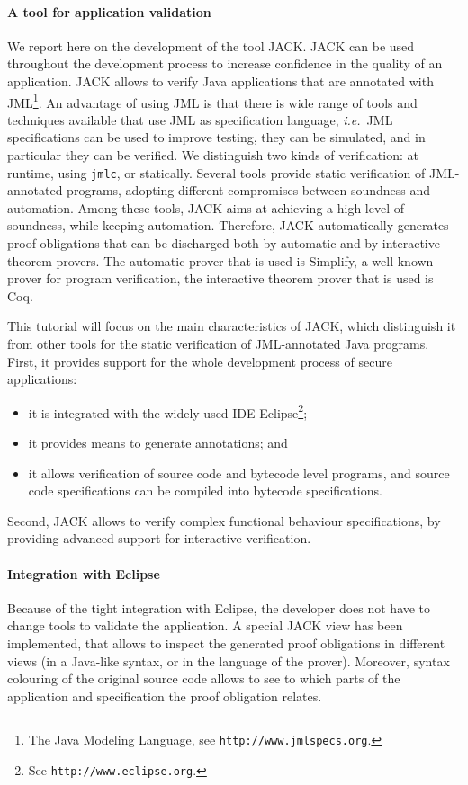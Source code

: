\documentclass[]{llncs}
\begin{document}
\paragraph{A tool for application validation}
We report here on the development of the tool JACK. JACK can be used
throughout the development process to increase confidence in the
quality of an application. JACK allows to verify Java applications
that are annotated with JML\footnote{The Java Modeling Language, see
\texttt{http://www.jmlspecs.org}.}. An advantage of using JML is that
there is wide range of tools and techniques available that use JML as
specification language, \emph{i.e.}\ JML specifications can be used to
improve testing, they can be simulated, and in particular they can be
verified. We distinguish two kinds of verification: at runtime, using
\texttt{jmlc}, or statically. Several tools provide
static verification of JML-annotated programs, adopting different
compromises between soundness and automation.  Among these tools, JACK
aims at achieving a high level of soundness, while keeping
automation. Therefore, JACK automatically generates proof obligations
that can be discharged both by automatic and by interactive theorem
provers. The automatic prover that is used is Simplify, a well-known
prover for program verification, the interactive theorem prover that
is used is Coq.

This tutorial will focus on the main characteristics of JACK, which
distinguish it from other tools for the static verification of
JML-annotated Java programs. First, it provides support for the whole
development process of secure applications:
\begin{itemize}
\item it is integrated with the widely-used IDE Eclipse\footnote{See
\texttt{http://www.eclipse.org}.};
\item it provides means to generate annotations; and
\item it allows verification of source code and bytecode level
programs, and source code specifications can be compiled into bytecode
specifications.
\end{itemize}
Second, JACK allows to verify complex functional behaviour
specifications, by providing advanced support for interactive
verification. 


\paragraph{Integration with Eclipse}
Because of the tight integration with Eclipse, the developer does not
have to change tools to validate the application. A special JACK view
has been implemented, that allows to inspect the generated proof
obligations in different views (in a Java-like syntax, or in the
language of the prover). Moreover, syntax colouring of the original
source code allows to see to which parts of the application and
specification the proof obligation relates.
\end{document}
